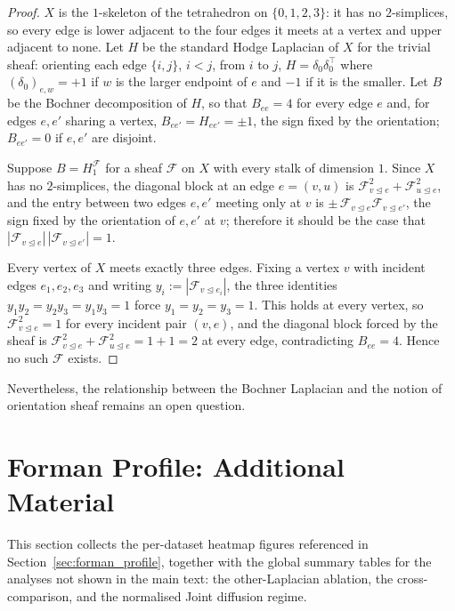 \begin{proof}
$X$ is the $1$-skeleton of the tetrahedron on $\{0,1,2,3\}$: it has no
$2$-simplices, so every edge is lower adjacent to the four edges it meets at a
vertex and upper adjacent to none. Let $H$ be the standard Hodge Laplacian of
$X$ for the trivial sheaf: orienting each edge $\{i,j\}$, $i<j$, from $i$ to
$j$, $H = \delta_0\delta_0^\top$ where $(\delta_0)_{e,w}=+1$ if $w$ is the
larger endpoint of $e$ and $-1$ if it is the smaller. Let $B$ be the Bochner
decomposition of $H$, so that $B_{ee}=4$ for every edge $e$ and, for edges
$e,e'$ sharing a vertex, $B_{ee'}=H_{ee'}=\pm1$, the sign fixed by the
orientation; $B_{ee'}=0$ if $e,e'$ are disjoint.

Suppose $B = H_1^{\mathcal F}$ for a sheaf $\mathcal F$ on $X$ with every stalk
of dimension $1$. Since $X$ has no $2$-simplices, the diagonal block at an edge
$e=(v,u)$ is $\mathcal F_{v\trianglelefteq e}^2 + \mathcal F_{u\trianglelefteq
e}^2$, and the entry between two edges $e,e'$ meeting only at $v$ is
$\pm\,\mathcal F_{v\trianglelefteq e}\mathcal F_{v\trianglelefteq e'}$, the sign
fixed by the orientation of $e,e'$ at $v$; therefore it should be the case that
$|\mathcal F_{v\trianglelefteq e}|\,|\mathcal F_{v\trianglelefteq e'}| =1$.

Every vertex of $X$ meets exactly three edges. Fixing a vertex $v$ with
incident edges $e_1,e_2,e_3$ and writing $y_i := |\mathcal F_{v\trianglelefteq
e_i}|$, the three identities $y_1y_2=y_2y_3=y_1y_3=1$ force $y_1=y_2=y_3=1$.
This holds at every vertex, so $\mathcal F_{v\trianglelefteq e}^2=1$ for every
incident pair $(v,e)$, and the diagonal block forced by the sheaf is
$\mathcal F_{v\trianglelefteq e}^2+\mathcal F_{u\trianglelefteq e}^2=1+1=2$ at
every edge, contradicting $B_{ee}=4$. Hence no such $\mathcal F$ exists.
\end{proof}

Nevertheless, the relationship between the Bochner Laplacian and the notion of
orientation sheaf remains an open question.


\section{Forman Profile: Additional Material}
\label{sec:forman_supplementary}

This section collects the per-dataset heatmap figures referenced in Section~\ref{sec:forman_profile}, together with the global summary tables for the analyses not shown in the main text: the other-Laplacian ablation, the cross-comparison, and the normalised Joint diffusion regime.

